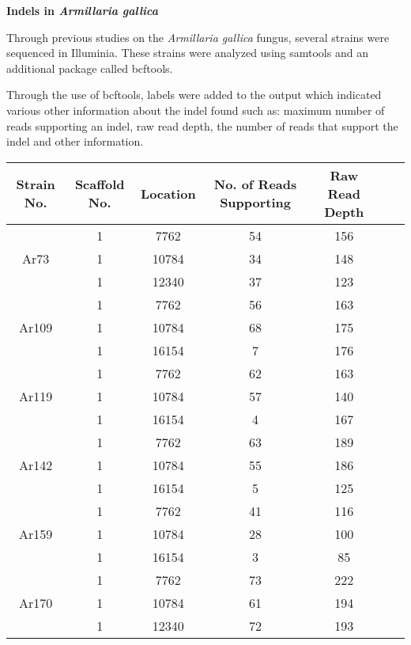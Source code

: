 \documentclass{report}
\begin{document}
\textbf{Indels in \textit{Armillaria gallica}}

Through previous studies on the \textit{Armillaria gallica} fungus, several strains were sequenced in Illuminia. These strains were analyzed using samtools and an additional package called bcftools. 

Through the use of bcftools, labels were added to the output which indicated various other information about the indel found such as: maximum number of reads supporting an indel, raw read depth, the number of reads that support the indel and other information.


\begin{table}[H]
\begin{center}
	\begin{tabular}{ |c|c|c|c|c|c|c| } 
		\hline
		Strain No. & Scaffold No. & Location & No. of Reads Supporting & Raw Read Depth \\
		\hline
		\multirow{3}{4em}{Ar73} & 1 & 7762 &54 & 156\\
		&1 & 10784 & 34 & 148\\
		&1 & 12340 & 37 & 123\\
		\hline
		\multirow{3}{4em}{Ar109} & 1 & 7762 & 56 & 163\\
		& 1 & 10784 & 68 & 175 \\
		& 1 & 16154 & 7 & 176 \\
		\hline
		\multirow{3}{4em}{Ar119} & 1 & 7762 & 62 & 163 \\
		& 1 & 10784 & 57 & 140 \\
		& 1 & 16154 & 4 & 167 \\
		\hline
		\multirow{3}{4em}{Ar142} & 1 & 7762 & 63 & 189 \\
		& 1 & 10784 & 55 & 186 \\
		& 1 & 16154 & 5 & 125 \\
		\multirow{3}{4em}{Ar159} & 1 & 7762 & 41 & 116 \\ 
		& 1 & 10784 & 28 & 100  \\ 
		& 1 & 16154 & 3 & 85 \\ 
		\hline
		\multirow{3}{4em}{Ar170} & 1 & 7762 & 73 & 222 \\ 
		& 1 & 10784 & 61 & 194  \\ 
		& 1 & 12340 & 72 & 193 \\ 

\end{tabular}
\end{center}
\end{table}
\end{document}
